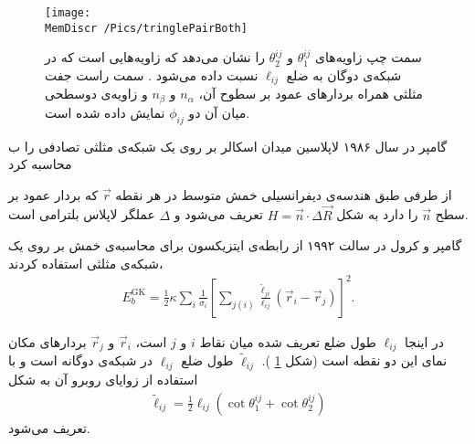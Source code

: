 \begin{figure}[h]
\begin{center}
\texttt{[image: \\MemDiscr /Pics/tringlePairBoth]}
\caption{
سمت چپ زاویه‌های 
$\theta_1^{ij}$
و
$\theta_2^{ij}$
را نشان می‌دهد که زاویه‌هایی است که در شبکه‌ی دوگان به ضلع
$\ell_{ij}$
نسبت داده می‌شود
\cite{Meyer2003}
. سمت راست جفت مثلثی همراه بردار‌های عمود بر سطوح آن،
$n_\alpha$
و
$n_\beta$
و زاویه‌ی دوسطحی میان آن دو
$\phi_{ij}$
نمایش داده شده ‌است.
}
\label{fig:trianglePairAngle}
\end{center}
\end{figure}

گامپر
در سال ۱۹۸۶ لاپلاسین میدان اسکالر بر روی یک شبکه‌ی مثلثی تصادفی را ب محاسبه کرد
\cite{Itzykson1986}

از طرفی طبق هندسه‌ی دیفرانسیلی  خمش متوسط در هر نقطه 
$\vec r$
که بردار عمود بر سطح 
$\vec n$
را دارد به شکل 
$H=\vec n\cdot\Delta \vec R$
تعریف می‌شود 
\cite{Gompper1996}
و 
$\Delta$
عملگر لاپلاس بلترامی 
است. 


گامپر و کرول در سالت ۱۹۹۲ از رابطه‌ی ایتزیکسون برای محاسبه‌ی خمش بر روی یک شبکه‌ی مثلثی استفاده کردند،
\begin{eqnarray}
E_{b}^\text{GK}=\frac{1}{2}\kappa\sum_{i}\frac{1}{\sigma_i}\left[\sum_{j(i)}\frac{\tilde\ell_{ji}}{\ell_{ij}}(\vec r_i-\vec r_j)\right]^2.
\label{eq:ItzyksonPotential}
\end{eqnarray}

در اینجا 
$\ell_{ij}$
طول ضلع تعریف شده میان نقاط 
$i$
و
$j$
است، 
$\vec r_i$
و
$\vec r_j$
بردار‌های مکان نمای این دو نقطه‌ است (شکل
\ref{fig:trianglePairAngle}
). 
$\tilde\ell_{ij}$
طول ضلع 
$\ell_{ij}$
در شبکه‌ی دوگانه‌ 
است و با استفاده از زوایا‌ی روبرو آن به شکل 
\begin{eqnarray}
\tilde\ell_{ij}=\frac{1}{2}\ell_{ij}(\cot\theta_1^{ij}+\cot\theta_2^{ij})
\label{eq:dualLattice}
\end{eqnarray}
تعریف می‌شود.

